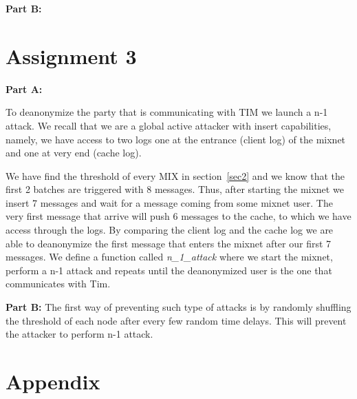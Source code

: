 \documentclass[preprint,12pt,3p]{elsarticle}
\begin{document}
\textbf{Part B:}

\section*{Assignment 3}
\textbf{Part A:}

To deanonymize the party that is communicating with TIM we launch a n-1 attack. We recall that we are a global active attacker with insert capabilities, namely, we have access to two logs one at the entrance (client log) of the mixnet and one at very end (cache log).

We have find the threshold of every MIX in section~\ref{sec2} and we know that the first 2 batches are triggered with 8 messages. Thus, after starting the mixnet we insert 7 messages and wait for a message coming from some mixnet user. The very first message that arrive will push 6 messages to the cache, to which we have access through the logs. By comparing the client log and the cache log we are able to deanonymize the first message that enters the mixnet after our first 7 messages. We define a function called \textit{n\_1\_attack} where we start the mixnet, perform a n-1 attack and repeats until the deanonymized user is the one that communicates with Tim. \newline


\textbf{Part B:}
The first way of preventing such type of attacks is by randomly shuffling the threshold of each node after every few random time delays. This will prevent the attacker to perform n-1 attack.





\appendix
\section{Appendix}
\end{document}
